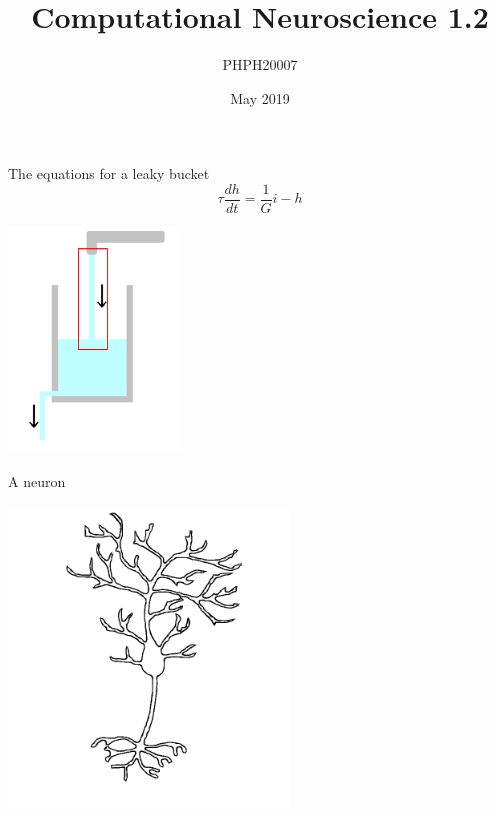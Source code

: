 \documentclass{beamer}
\title[Computational Neuroscience 1.2]{Computational Neuroscience 1.2}
\author{PHPH20007}
\institute{\texttt{github.com/conorhoughton/PHPH20007}}
\date{May 2019}
\newcommand{\crish}{\color{reddish}}
\newcommand{\cbla}{\color{black}}
\begin{document}
\maketitle

\begin{frame}{The equations for a leaky bucket}
  \crish
  $$\tau\frac{dh}{dt}=\frac{1}{G}i-h$$\cbla
  
  \begin{center}
    \includegraphics[height=6cm]{glass_in.png}
  \end{center}
\end{frame}


\begin{frame}{A neuron}
  \begin{center}
    \includegraphics[height=8cm]{neuron.png}
  \end{center}
\end{frame}
\end{document}
